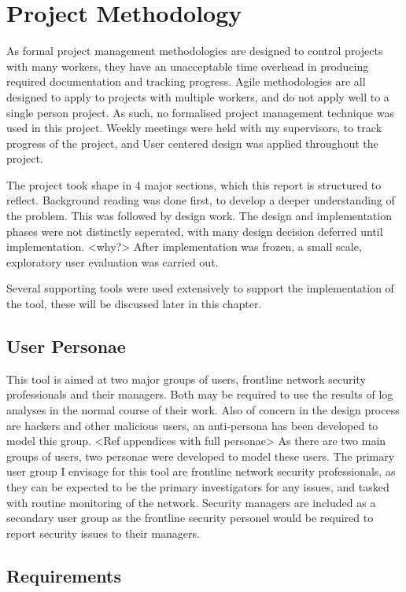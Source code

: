 \chapter{Project Methodology}\label{proj}

As formal project management methodologies are designed to control projects with many workers, they have an unacceptable time overhead in producing required documentation and tracking progress. Agile methodologies are all designed to apply to projects with multiple workers, and do not apply well to a single person project. As such, no formalised project management technique was used in this project.  
Weekly meetings were held with my supervisors, to track progress of the project, and User centered design was applied throughout the project. 

The project took shape in 4 major sections, which this report is structured to reflect. Background reading was done first, to develop a deeper understanding of the problem. This was followed by design work. The design and implementation phases were not distinctly seperated, with many design decision deferred until implementation. <why?> After implementation was frozen, a small scale, exploratory user evaluation was carried out.


Several supporting tools were used extensively to support the implementation of the tool, these will be discussed later in this chapter. 

\section{User Personae}

This tool is aimed at two major groups of users, frontline network security professionals and their managers.
Both may be required to use the results of log analyses in the normal course of their work. Also of concern in the design process are hackers and other malicious users, an anti-persona has been developed to model this group. <Ref appendices with full personae> As there are two main groups of users, two personae were developed to model these users. 
The primary user group I envisage for this tool are frontline network security professionals, as they can be expected to be the primary investigators for any issues, and tasked with routine monitoring of the network.
Security managers are included as a secondary user group as the frontline security personel would be required to report security issues to their managers.

\section{Requirements}\label{reqs}

